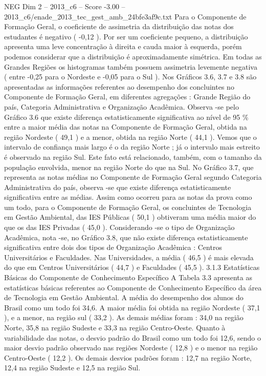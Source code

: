 \begin{textsample}{NEG Dim 2 – 2013\_c6 – Score -3.00 – 2013\_c6/enade\_2013\_tec\_gest\_amb\_24bfe3af9c.txt}
Para o Componente de Formação Geral, o coeficiente de assimetria da distribuição das notas dos estudantes é negativo ( -0,12 ).
Por ser um coeficiente pequeno, a distribuição apresenta uma leve concentração à direita e cauda maior à esquerda, porém podemos considerar que a distribuição é aproximadamente simétrica.
Em todas as Grandes Regiões os histogramas também possuem assimetria levemente negativa ( entre -0,25 para o Nordeste e -0,05 para o Sul ).
Nos Gráficos 3.6, 3.7 e 3.8 são apresentadas as informações referentes ao desempenho dos concluintes no Componente de Formação Geral, em diferentes agregações : Grande Região do país, Categoria Administrativa e Organização Acadêmica.
Observa -se pelo Gráfico 3.6 que existe diferença estatisticamente significativa ao nível de 95 \% entre a maior média das notas na Componente de Formação Geral, obtida na região Nordeste ( 49,1 ) e a menor, obtida na região Norte ( 44,1 ).
Vemos que o intervalo de confiança mais largo é o da região Norte ; já o intervalo mais estreito é observado na região Sul.
Este fato está relacionado, também, com o tamanho da população envolvida, menor na região Norte do que na Sul.
No Gráfico 3.7, que representa as notas médias no Componente de Formação Geral segundo Categoria Administrativa do país, observa -se que existe diferença estatisticamente significativa entre as médias.
Assim como ocorreu para as notas da prova como um todo, para o Componente de Formação Geral, os concluintes de Tecnologia em Gestão Ambiental, das IES Públicas ( 50,1 ) obtiveram uma média maior do que os das IES Privadas ( 45,0 ).
Considerando -se o tipo de Organização Acadêmica, nota -se, no Gráfico 3.8, que não existe diferença estatisticamente significativa entre dois dos tipos de Organização Acadêmica : Centros Universitários e Faculdades.
Nas Universidades, a média ( 46,5 ) é mais elevada do que em Centros Universitários ( 44,7 ) e Faculdades ( 45,5 ). 3.1.3 Estatísticas Básicas do Componente de Conhecimento Específico A Tabela 3.3 apresenta as estatísticas básicas referentes ao Componente de Conhecimento Específico da área de Tecnologia em Gestão Ambiental.
A média do desempenho dos alunos do Brasil como um todo foi 34,6.
A maior média foi obtida na região Nordeste ( 37,1 ), e a menor, na região sul ( 33,2 ).
As demais médias foram : 34,0 na região Norte, 35,8 na região Sudeste e 33,3 na região Centro-Oeste.
Quanto à variabilidade das notas, o desvio padrão do Brasil como um todo foi 12,6, sendo o maior desvio padrão observado nas regiões Nordeste ( 12,8 ) e o menor na região Centro-Oeste ( 12,2 ).
Os demais desvios padrões foram : 12,7 na região Norte, 12,4 na região Sudeste e 12,5 na região Sul.

\end{textsample}
